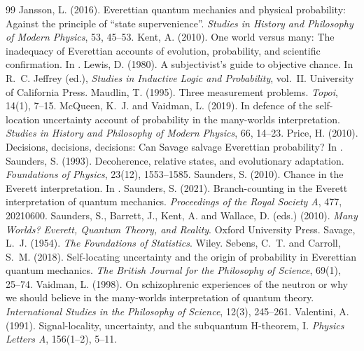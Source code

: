\documentclass{situationist-preprint}
\begin{document}
\begin{thebibliography}{99}
 Jansson, L. (2016). Everettian quantum mechanics and physical probability: Against the principle of ``state supervenience''. \emph{Studies in History and Philosophy of Modern Physics}, 53, 45--53.
 Kent, A. (2010). One world versus many: The inadequacy of Everettian accounts of evolution, probability, and scientific confirmation. In \citet{Saunders2010}.
 Lewis, D. (1980). A subjectivist's guide to objective chance. In R.~C. Jeffrey (ed.), \emph{Studies in Inductive Logic and Probability}, vol.~II. University of California Press.
 Maudlin, T. (1995). Three measurement problems. \emph{Topoi}, 14(1), 7--15.
 McQueen, K.~J. and Vaidman, L. (2019). In defence of the self-location uncertainty account of probability in the many-worlds interpretation. \emph{Studies in History and Philosophy of Modern Physics}, 66, 14--23.
 Price, H. (2010). Decisions, decisions, decisions: Can Savage salvage Everettian probability? In \citet{Saunders2010}.
 Saunders, S. (1993). Decoherence, relative states, and evolutionary adaptation. \emph{Foundations of Physics}, 23(12), 1553--1585.
 Saunders, S. (2010). Chance in the Everett interpretation. In \citet{Saunders2010}.
 Saunders, S. (2021). Branch-counting in the Everett interpretation of quantum mechanics. \emph{Proceedings of the Royal Society A}, 477, 20210600.
 Saunders, S., Barrett, J., Kent, A. and Wallace, D. (eds.) (2010). \emph{Many Worlds? Everett, Quantum Theory, and Reality}. Oxford University Press.
 Savage, L.~J. (1954). \emph{The Foundations of Statistics}. Wiley.
 Sebens, C.~T. and Carroll, S.~M. (2018). Self-locating uncertainty and the origin of probability in Everettian quantum mechanics. \emph{The British Journal for the Philosophy of Science}, 69(1), 25--74.
 Vaidman, L. (1998). On schizophrenic experiences of the neutron or why we should believe in the many-worlds interpretation of quantum theory. \emph{International Studies in the Philosophy of Science}, 12(3), 245--261.
 Valentini, A. (1991). Signal-locality, uncertainty, and the subquantum H-theorem, I. \emph{Physics Letters A}, 156(1--2), 5--11.

\end{thebibliography}
\end{document}
